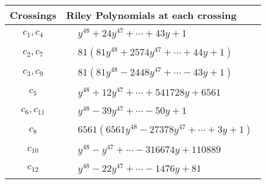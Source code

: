\documentclass[1p]{elsarticle_modified}
\theoremstyle{definition}
\begin{document}
\begin{tabular}{m{50pt}|m{274pt}}
Crossings & \hspace{64pt}Riley Polynomials at each crossing \\
\hline $$\begin{aligned}c_{1},c_{4}\end{aligned}$$&$\begin{aligned}
&y^{48}+24 y^{47}+\cdots+43 y+1
\end{aligned}$\\
\hline $$\begin{aligned}c_{2},c_{7}\end{aligned}$$&$\begin{aligned}
&81(81 y^{48}+2574 y^{47}+\cdots+44 y+1)
\end{aligned}$\\
\hline $$\begin{aligned}c_{3},c_{9}\end{aligned}$$&$\begin{aligned}
&81(81 y^{48}-2448 y^{47}+\cdots-43 y+1)
\end{aligned}$\\
\hline $$\begin{aligned}c_{5}\end{aligned}$$&$\begin{aligned}
&y^{48}+12 y^{47}+\cdots+541728 y+6561
\end{aligned}$\\
\hline $$\begin{aligned}c_{6},c_{11}\end{aligned}$$&$\begin{aligned}
&y^{48}-39 y^{47}+\cdots-50 y+1
\end{aligned}$\\
\hline $$\begin{aligned}c_{8}\end{aligned}$$&$\begin{aligned}
&6561(6561 y^{48}-27378 y^{47}+\cdots+3 y+1)
\end{aligned}$\\
\hline $$\begin{aligned}c_{10}\end{aligned}$$&$\begin{aligned}
&y^{48}- y^{47}+\cdots-316674 y+110889
\end{aligned}$\\
\hline $$\begin{aligned}c_{12}\end{aligned}$$&$\begin{aligned}
&y^{48}-22 y^{47}+\cdots-1476 y+81
\end{aligned}$\\
\hline
\end{tabular}\\~\\
\end{document}
